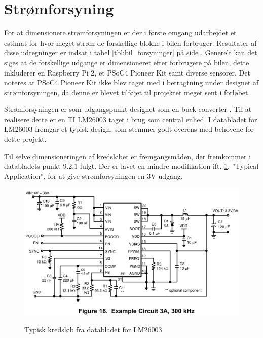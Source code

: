 \section{Strømforsyning}\label{sec:car_psu} %

For at dimensionere strømforsyningen er der i første omgang udarbejdet et estimat for hvor meget strøm de forskellige blokke i bilen forbruger.
Resultater af disse udregninger er indsat i tabel \ref{tbl:bil_forsyninger} på side \pageref{tbl:bil_forsyninger}.
Generelt kan det siges at de forskellige udgange er dimensioneret efter forbrugere på bilen, dette inkluderer en Raspberry Pi 2, et PSoC4 Pioneer Kit samt diverse sensorer.
Det noteres at PSoC4 Pioneer Kit ikke blev taget med i betragtning under designet af strømforsyningen, da denne er blevet tilføjet til projektet meget sent i forløbet.

Strømforsyningen er som udgangspunkt designet som en buck converter \cite[afsnit 6.10]{lib:analogteknik}.
Til at realisere dette er en TI LM26003 taget i brug som central enhed.
I databladet for LM26003\cite{lib:lm26003} fremgår et typisk design, som stemmer godt overens med behovene for dette projekt.

Til selve dimensioneringen af kredsløbet er fremgangsmåden, der fremkommer i databladets punkt 9.2.1 fulgt. 
Der er lavet en mindre modifikation ift. \ref{fig:lm26003fig16}, ''Typical Application'', for at give strømforsyningen en 3V udgang.

\begin{figure}[h]
\centering
\includegraphics[width=\textwidth* 9/10]{../fig/billeder/lm26003fig16}
\label{fig:lm26003fig16}
\caption{Typisk kredsløb fra databladet for LM26003}
\end{figure}

